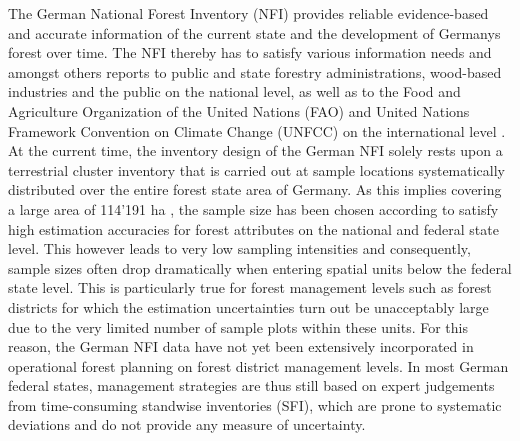 The German National Forest Inventory (NFI) provides reliable evidence-based and accurate information of the current state and the development of Germanys forest over time. The NFI thereby has to satisfy various information needs and amongst others reports to public and state forestry administrations, wood-based industries and the public on the national level, as well as to the Food and Agriculture Organization of the United Nations (FAO) and United Nations Framework Convention on Climate Change (UNFCC) on the international level \citep{polley2010intomppo}. At the current time, the inventory design of the German NFI solely rests upon a terrestrial cluster inventory that is carried out at sample locations systematically distributed over the entire forest state area of Germany. As this implies covering a large area of 114'191 ha \citep{bwi3}, the sample size has been chosen according to satisfy high estimation accuracies for forest attributes on the national and federal state level. This however leads to very low sampling intensities and consequently, sample sizes often drop dramatically when entering spatial units below the federal state level. This is particularly true for forest management levels such as forest districts for which the estimation uncertainties turn out be unacceptably large due to the very limited number of sample plots within these units. For this reason, the German NFI data have not yet been extensively incorporated in operational forest planning on forest district management levels. In most German federal states, management strategies are thus still based on expert judgements from time-consuming standwise inventories (SFI), which are prone to systematic deviations \cite{kulievsis2016} and do not provide any measure of uncertainty.\par

